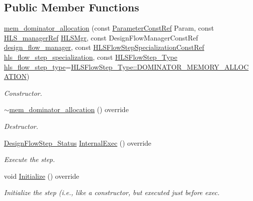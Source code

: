 \subsection*{Public Member Functions}
\begin{DoxyCompactItemize}
\item 
\hyperlink{classmem__dominator__allocation_ab513e5b2281e3ae087e6721df28bd3b9}{mem\+\_\+dominator\+\_\+allocation} (const \hyperlink{Parameter_8hpp_a37841774a6fcb479b597fdf8955eb4ea}{Parameter\+Const\+Ref} Param, const \hyperlink{hls__manager_8hpp_acd3842b8589fe52c08fc0b2fcc813bfe}{H\+L\+S\+\_\+manager\+Ref} \hyperlink{classHLS__step_ade85003a99d34134418451ddc46a18e9}{H\+L\+S\+Mgr}, const Design\+Flow\+Manager\+Const\+Ref \hyperlink{classDesignFlowStep_ab770677ddf087613add30024e16a5554}{design\+\_\+flow\+\_\+manager}, const \hyperlink{hls__step_8hpp_a5fdd2edf290c196531d21d68e13f0e74}{H\+L\+S\+Flow\+Step\+Specialization\+Const\+Ref} \hyperlink{classHLS__step_a843be75ba53b81876aa3c8b870ae8a55}{hls\+\_\+flow\+\_\+step\+\_\+specialization}, const \hyperlink{hls__step_8hpp_ada16bc22905016180e26fc7e39537f8d}{H\+L\+S\+Flow\+Step\+\_\+\+Type} \hyperlink{classHLS__step_aefd59af15346ec3f10bf12bd756e6777}{hls\+\_\+flow\+\_\+step\+\_\+type}=\hyperlink{hls__step_8hpp_ada16bc22905016180e26fc7e39537f8da3390f601e994d8e4078c5d5fd2b42313}{H\+L\+S\+Flow\+Step\+\_\+\+Type\+::\+D\+O\+M\+I\+N\+A\+T\+O\+R\+\_\+\+M\+E\+M\+O\+R\+Y\+\_\+\+A\+L\+L\+O\+C\+A\+T\+I\+ON})
\begin{DoxyCompactList}\small\item\em Constructor. \end{DoxyCompactList}\item 
\hyperlink{classmem__dominator__allocation_a4c2e1b1e8967803c23a7797edc71173c}{$\sim$mem\+\_\+dominator\+\_\+allocation} () override
\begin{DoxyCompactList}\small\item\em Destructor. \end{DoxyCompactList}\item 
\hyperlink{design__flow__step_8hpp_afb1f0d73069c26076b8d31dbc8ebecdf}{Design\+Flow\+Step\+\_\+\+Status} \hyperlink{classmem__dominator__allocation_a729c2a36b1495fbccb94e35dd6c433c3}{Internal\+Exec} () override
\begin{DoxyCompactList}\small\item\em Execute the step. \end{DoxyCompactList}\item 
void \hyperlink{classmem__dominator__allocation_a742ee8ca37f2b4123e62b365fa524016}{Initialize} () override
\begin{DoxyCompactList}\small\item\em Initialize the step (i.\+e., like a constructor, but executed just before exec. \end{DoxyCompactList}\end{DoxyCompactItemize}
